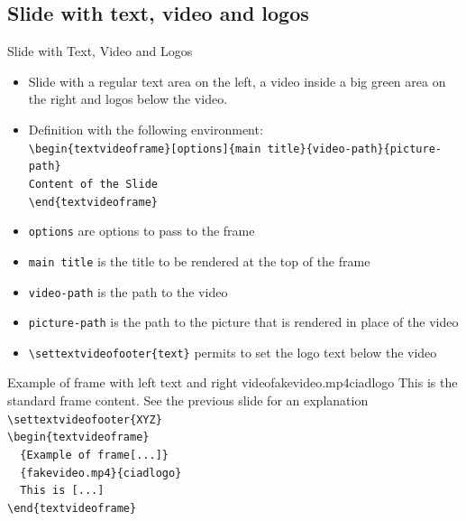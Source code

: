 \documentclass[english,sectioncirclenumberstyle]{ciadbeamer}
\begin{document}
\subsection{Slide with text, video and logos}
\subsectiontableofcontentslide

\begin{frame}{Slide with Text, Video and Logos}
	\begin{itemize}
		\item Slide with a regular text area on the left, a video inside a big green area on the right and logos below the video.
		\item Definition with the following environment: \\
		\texttt{{\textbackslash}begin\{textvideoframe\}[options]\{main title\}\{video-path\}\{picture-path\}} \\
		\texttt{Content of the Slide} \\
		\texttt{{\textbackslash}end\{textvideoframe\}}
		\item \texttt{options} are options to pass to the frame
		\item \texttt{main title} is the title to be rendered at the top of the frame
		\item \texttt{video-path} is the path to the video
		\item \texttt{picture-path} is the path to the picture that is rendered in place of the video
		\item \texttt{{\textbackslash}settextvideofooter\{text\}} permits to set the logo text below the video
	\end{itemize}
\end{frame}

\begin{textvideoframe}{{Example of frame} with left text and right video}{fakevideo.mp4}{ciadlogo}
	This is the standard frame content. See the previous slide for an explanation \\[.5cm]
	\texttt{{\textbackslash}settextvideofooter\{XYZ\}} \\[.5cm]
	\texttt{{\textbackslash}begin\{textvideoframe\}} \\
	\texttt{~~\{Example of frame[...]\}} \\
	\texttt{~~\{fakevideo.mp4\}\{ciadlogo\}} \\
	\texttt{~~This is [...]} \\
	\texttt{{\textbackslash}end\{textvideoframe\}}
\end{textvideoframe}
\end{document}
